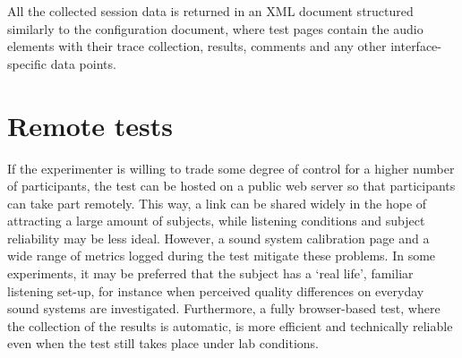 \documentclass{sig-alternate}
\begin{document}
    All the collected session data is returned in an XML document structured similarly to the configuration document, where test pages contain the audio elements with their trace collection, results, comments and any other interface-specific data points.
    
\section{Remote tests} %
	\label{sec:remote}

	If the experimenter is willing to trade some degree of control for a higher number of participants, the test can be hosted on a public web server so that participants can take part remotely. This way, a link can be shared widely in the hope of attracting a large amount of subjects, while listening conditions and subject reliability may be less ideal. However, a sound system calibration page and a wide range of metrics logged during the test mitigate these problems. In some experiments, it may be preferred that the subject has a `real life', familiar listening set-up, for instance when perceived quality differences on everyday sound systems are investigated. 
	Furthermore, a fully browser-based test, where the collection of the results is automatic, is more efficient and technically reliable even when the test still takes place under lab conditions.
\end{document}
